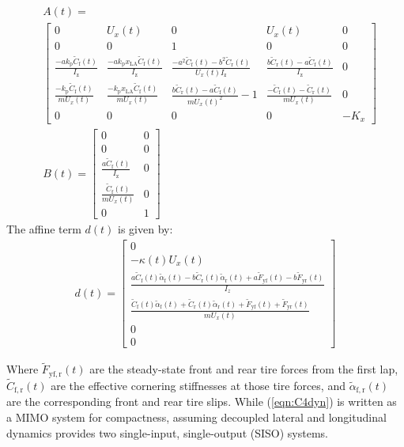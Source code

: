\documentclass[9pt,shortpaper,twoside,web]{ieeecolor}
\begin{document}
{{{\begin{align}
\label{eqn:C4dyn}
 &A(t)  = \\ \nonumber
  &\left[\begin{smallmatrix}
  0 & U_x(t) & 0 & U_x(t) & 0\\ 
  0 & 0 & 1 & 0 & 0 \\ 
  \frac{-ak_\mathrm{p} \tilde{C}_\mathrm{f}(t)}{I_\mathrm{z}}  & \frac{-ak_\mathrm{p}x_\mathrm{LA}\tilde{C}_\mathrm{f}(t)}{I_\mathrm{z}}  & \frac{-a^2\tilde{C}_\mathrm{f}(t)-b^2\tilde{C}_\mathrm{r}(t)}{U_x(t)I_\mathrm{z}} & \frac{b\tilde{C}_\mathrm{r}(t) - a\tilde{C}_\mathrm{f}(t)}{I_\mathrm{z}} & 0 \\
  \frac{-k_\mathrm{p}\tilde{C}_\mathrm{f}(t)}{mU_x(t)}  & \frac{-k_\mathrm{p}x_\mathrm{LA}\tilde{C}_\mathrm{f}(t)}{mU_x(t)}  & \frac{b\tilde{C}_\mathrm{r}(t)-a\tilde{C}_\mathrm{f}(t)}{mU_x(t)^2}-1 & \frac{-\tilde{C}_\mathrm{f}(t) - \tilde{C}_\mathrm{r}(t)}{mU_x(t)} & 0 \\
  0 & 0 & 0 & 0 & -K_x
  \end{smallmatrix}\right] \\
&B(t) =\begin{bmatrix} 0 & 0 \\	 	0 & 0 		\\ 		\frac{a \tilde{C}_\mathrm{f}(t)}{I_\mathrm{z}} & 0 		\\ 		\frac{\tilde{C}_\mathrm{f}(t)}{mU_x(t)} & 0 		\\ 0 & 1 \end{bmatrix} 
\end{align}
The affine term $d(t)$ is given by: 
\begin{align}
d(t) = \left[\begin{matrix} 0 \\
               -\kappa(t) U_x(t) \\ 
			    \frac{a\tilde{C}_\mathrm{f}(t)\tilde{\alpha}_\mathrm{f}(t) - b\tilde{C}_\mathrm{r}(t)\tilde{\alpha}_\mathrm{r}(t) + a\tilde{F}_\mathrm{yf}(t) - b\tilde{F}_\mathrm{yr}(t)}{I_z}\\
				\frac{\tilde{C}_\mathrm{f}(t)\tilde{\alpha}_\mathrm{f}(t) + \tilde{C}_\mathrm{r}(t)\tilde{\alpha}_\mathrm{r}(t) + \tilde{F}_\mathrm{yf}(t) + \tilde{F}_\mathrm{yr}(t)}{mU_x(t)}\\
				0 \\
				0
				\end{matrix}\right]
\end{align}


Where $\tilde{F}_\mathrm{yf,r}(t)$ are the steady-state front and rear tire forces from the first lap, $\tilde{C}_\mathrm{f,r}(t)$ are the effective cornering stiffnesses at those tire forces, and $\tilde{\alpha}_\mathrm{f,r}(t)$ are the corresponding front and rear tire slips. While (\ref{eqn:C4dyn}) is written as a MIMO system for compactness, assuming decoupled lateral and longitudinal 
dynamics provides two single-input, single-output (SISO) systems. 

}}}
\end{document}
